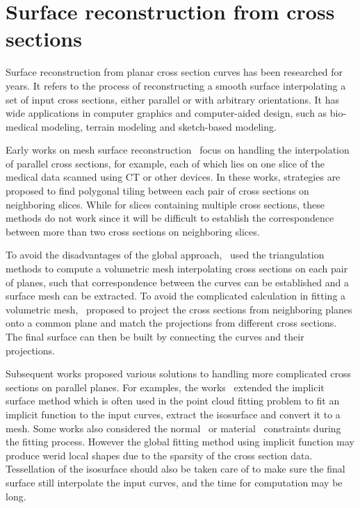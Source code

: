 \section{Surface reconstruction from cross sections}\label{ch2:sec:surfreconst}

Surface reconstruction  from planar cross section curves has been
researched for years. It refers to the process of reconstructing a
smooth surface interpolating a set of input cross sections, either
parallel or with arbitrary orientations. It has wide applications in
computer graphics and computer-aided design, such as bio-medical
modeling, terrain modeling and sketch-based modeling.

Early  works on mesh surface reconstruction~\cite{KE75, FKU77,
CS78, Kd82, GD82, WA86} focus on handling the interpolation of
parallel cross sections, for example, each of which lies on one
slice of the medical data scanned using CT or other devices. In
these works, strategies are proposed to find polygonal tiling
between each pair of cross sections on neighboring slices. While
for slices containing multiple cross sections, these methods do not
work since it will be difficult to establish the correspondence
between more than two cross sections on neighboring slices.

To avoid the  disadvantages of the global approach,~\cite{BJ88,
MSS92, GB93, FL98, CD99} used the triangulation methods to compute
a volumetric mesh interpolating cross sections on each pair of
planes, such that correspondence between the curves can be
established and a surface mesh can be extracted. To avoid the
complicated calculation in fitting a volumetric
mesh,~\cite{BS96,BCL96,OPC96,KSS00,BGLS04,JWCET05,BV07} proposed to
project the cross sections from neighboring planes onto a common
plane and match the projections from different cross sections. The
final surface can then be built by connecting the curves and their
projections.

Subsequent  works proposed various solutions to handling more
complicated cross sections on parallel planes. For examples, the
works~\cite{HZB92, CNKG02, TO99} extended the implicit surface
method which is often used in the point cloud fitting problem to fit
an implicit function to the input curves, extract the isosurface and
convert it to a mesh. Some works also considered the
normal~\cite{BMSdV10} or material~\cite{WD00} constraints during the
fitting process. However the global fitting method using implicit
function may produce werid local shapes due to the sparsity of the
cross section data. Tessellation of the isosurface should also be
taken care of to make sure the final surface still interpolate the
input curves, and the time for computation may be long.

